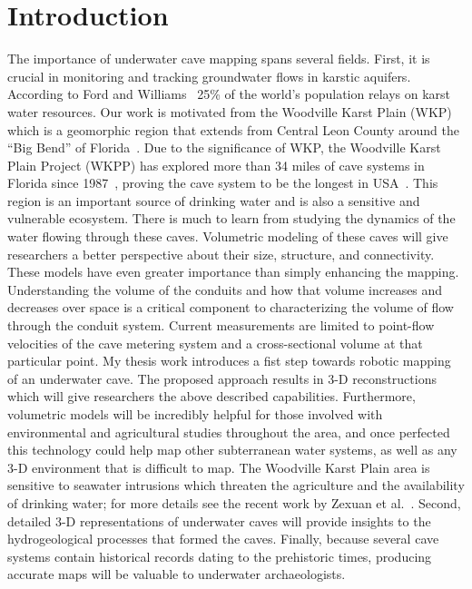 \chapter*{Introduction}\label{ch:intro}

The importance of underwater cave mapping spans several fields. First, it is crucial in monitoring and tracking groundwater flows in karstic aquifers. According to Ford and Williams~\cite{Ford1994} 25\% of the world's population relays on karst water resources. Our work is motivated from the Woodville Karst Plain (WKP) which is a geomorphic region that extends from Central Leon County around the ``Big Bend'' of Florida~\cite{Lane2001}. Due to the significance of WKP, the Woodville Karst Plain Project (WKPP) has explored more than 34 miles of cave systems in Florida since 1987~\cite{WKPP}, proving the cave system to be the longest in USA~\cite{WKPP1}. This region is an important source of drinking water and is also a sensitive and vulnerable ecosystem. There is much to learn from studying the dynamics of the water flowing through these caves. Volumetric modeling of these caves will give researchers a better perspective about their size, structure, and connectivity. These models have even greater importance than simply enhancing the mapping. Understanding the volume of the conduits and how that volume increases and decreases over space is a critical component to characterizing the volume of flow through the conduit system. Current measurements are limited to point-flow velocities of the cave metering system and a cross-sectional volume at that particular point. My thesis work introduces a fist step towards robotic mapping of an underwater cave. The proposed approach results in 3\hyp D reconstructions which will give researchers the above described capabilities. Furthermore, volumetric models will be incredibly helpful for those involved with environmental and agricultural studies throughout the area, and once perfected this technology could help map other subterranean water systems, as well as any 3\hyp D environment that is difficult to map. The Woodville Karst Plain area is sensitive to seawater intrusions which threaten the agriculture and the availability of drinking water; for more details see the recent work by Zexuan et al.~\cite{ZexuanReports2016}. Second, detailed 3\hyp D representations of underwater caves will provide insights to the hydrogeological processes that formed the caves. Finally, because several cave systems contain historical records dating to the prehistoric times, producing accurate maps will be valuable to underwater archaeologists. 

